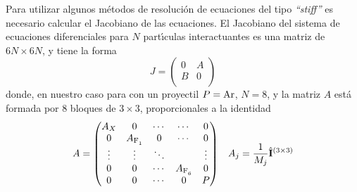 Para utilizar algunos m\'{e}todos de resoluci\'{o}n de ecuaciones del tipo \emph{``stiff''} es necesario calcular el Jacobiano de las ecuaciones.
El Jacobiano del sistema de ecuaciones diferenciales para $N$ part\'{\i}culas interactuantes es una matriz de $6N \times 6N$, y tiene la forma
\begin{equation}
  \label{Q:Jacob-ec-dif}
  J =
  \begin{pmatrix}
    0 & A \\
    B & 0 \\
  \end{pmatrix}
\end{equation}
donde, en nuestro caso para  con un proyectil $P=\ce{Ar}$, $N=8$, y la matriz $A$ est\'{a} formada por 8 bloques de $3 \times 3$, proporcionales a la identidad
\begin{align}
  \label{Q:Jacob-ec-dif-A}
  A &=
\begin{pmatrix}
  A_{X} & 0 & \cdots &  \cdots & 0 \\
  0 & A_{\ce{F1}}& 0 & \cdots & 0 \\
  \vdots  & \vdots  & \ddots &  & \vdots  \\
  0 &  0 &\cdots &  A_{\ce{F6}} & 0 \\
  0 & 0 & \cdots & 0 & P
\end{pmatrix}    &A_{j} = \frac{1}{M_{j}} \oper{I}^{(3\times 3)}
\end{align}

